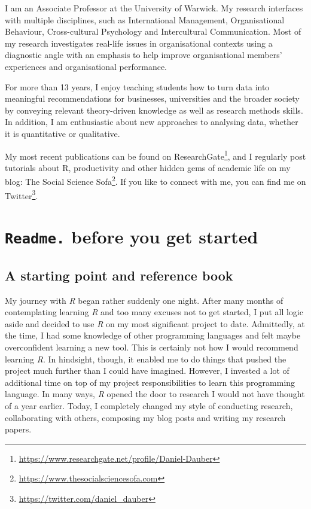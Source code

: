 \documentclass[
  letterpaper,
]{krantz}
\renewcommand{\href}[2]{#2\footnote{\url{#1}}}
\begin{document}

I am an Associate Professor at the University of Warwick. My research
interfaces with multiple disciplines, such as International Management,
Organisational Behaviour, Cross-cultural Psychology and Intercultural
Communication. Most of my research investigates real-life issues in
organisational contexts using a diagnostic angle with an emphasis to
help improve organisational members' experiences and organisational
performance.

For more than 13 years, I enjoy teaching students how to turn data into
meaningful recommendations for businesses, universities and the broader
society by conveying relevant theory-driven knowledge as well as
research methods skills. In addition, I am enthusiastic about new
approaches to analysing data, whether it is quantitative or qualitative.

My most recent publications can be found on
\href{https://www.researchgate.net/profile/Daniel-Dauber}{ResearchGate},
and I regularly post tutorials about R, productivity and other hidden
gems of academic life on my blog:
\href{https://www.thesocialsciencesofa.com}{The Social Science Sofa}. If
you like to connect with me, you can find me on
\href{https://twitter.com/daniel_dauber}{Twitter}.


\chapter{\texorpdfstring{\texttt{Readme.} before you get
started}{Readme. before you get started}}\label{readme-before-you-get-started}

\section{A starting point and reference
book}\label{a-starting-point-and-reference-book}

My journey with \emph{R} began rather suddenly one night. After many
months of contemplating learning \emph{R} and too many excuses not to
get started, I put all logic aside and decided to use \emph{R} on my
most significant project to date. Admittedly, at the time, I had some
knowledge of other programming languages and felt maybe overconfident
learning a new tool. This is certainly not how I would recommend
learning \emph{R}. In hindsight, though, it enabled me to do things that
pushed the project much further than I could have imagined. However, I
invested a lot of additional time on top of my project responsibilities
to learn this programming language. In many ways, \emph{R} opened the
door to research I would not have thought of a year earlier. Today, I
completely changed my style of conducting research, collaborating with
others, composing my blog posts and writing my research papers.
\end{document}
